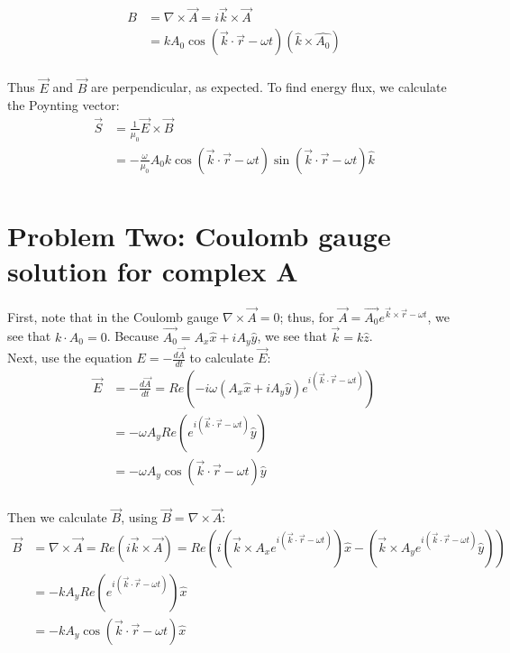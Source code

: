 \documentclass[10pt]{article} %
\begin{document}
\begin{align*}
  B &= \nabla \times \vec{A} = i\vec{k}\times\vec{A}\\
  &= kA_0\cos(\vec{k}\cdot\vec{r}-\omega t)(\hat{k}\times\hat{A_0})\\
\end{align*}

Thus $\vec{E}$ and $\vec{B}$ are perpendicular, as expected. To find energy flux, we calculate the Poynting vector:\\

\begin{align*}
  \vec{S} &= \frac{1}{\mu_0}\vec{E}\times\vec{B}\\
  &= -\frac{\omega}{\mu_0} A_0k\cos(\vec{k}\cdot\vec{r}-\omega t)\sin(\vec{k}\cdot\vec{r}-\omega t)\hat{k}\\
\end{align*}

\section{Problem Two: Coulomb gauge solution for complex A}
First, note that in the Coulomb gauge $\nabla \times \vec{A} = 0$; thus, for $\vec{A} = \vec{A_0}e^{\vec{k}\times\vec{r}-\omega t}$, we see that $k\cdot A_0=0$. Because $\vec{A_0}=A_x\hat{x}+iA_y\hat{y}$, we see that $\vec{k}=k\hat{z}$.\\

Next, use the equation $E=-\frac{d\vec{A}}{dt}$ to calculate $\vec{E}$:\\

\begin{align*}
  \vec{E} &= -\frac{d\vec{A}}{dt} = Re\left(-i\omega(A_x\hat{x}+iA_y\hat{y})e^{i(\vec{k}\cdot\vec{r}-\omega t)}\right)\\
  &= -\omega A_yRe(e^{i(\vec{k}\cdot\vec{r}-\omega t)}\hat{y})\\
  &= -\omega A_y\cos(\vec{k}\cdot\vec{r}-\omega t)\hat{y}\\
\end{align*}

Then we calculate $\vec{B}$, using $\vec{B}=\nabla \times \vec{A}$:\\

\begin{align*}
  \vec{B} &= \nabla \times \vec{A} = Re\left(i\vec{k} \times \vec{A}\right) = Re\left(i(\vec{k} \times A_xe^{i(\vec{k}\cdot\vec{r}-\omega t)})\hat{x} - (\vec{k} \times A_ye^{i(\vec{k}\cdot\vec{r}-\omega t)}\hat{y})\right)\\
  &= -kA_yRe(e^{i(\vec{k}\cdot\vec{r}-\omega t)})\hat{x}\\
  &= -kA_y\cos(\vec{k}\cdot\vec{r}-\omega t)\hat{x}\\
\end{align*}
\end{document}
